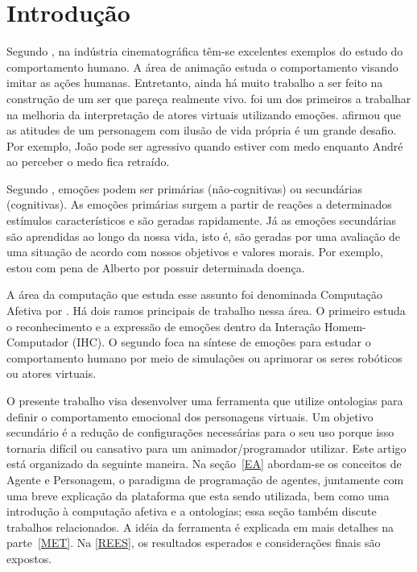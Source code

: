 \chapter{Introdução}

Segundo \citet{terzopoulos1998behavioral}, na indústria cinematográfica têm-se
excelentes exemplos do estudo do comportamento humano.  A área de animação
estuda o comportamento visando imitar as ações humanas.  Entretanto, ainda há
muito trabalho a ser feito na construção de um ser que pareça realmente vivo.
%
\citet{bates1994role} foi um dos primeiros a trabalhar na melhoria da
interpretação de atores virtuais utilizando emoções.
\citeauthor{bates1994role} afirmou que as atitudes de um personagem com ilusão
de vida própria é um grande desafio.  Por exemplo, João pode ser agressivo
quando estiver com medo enquanto André ao perceber o medo fica retraído.

Segundo \citet{damasio2004erro}, emoções podem ser primárias (não-cognitivas)
ou secundárias (cognitivas).  As emoções primárias surgem a partir de reações
a determinados estímulos característicos e são geradas rapidamente.  Já as
emoções secundárias são aprendidas ao longo da nossa vida, isto é, são geradas
por uma avaliação de uma situação de acordo com nossos objetivos e valores
morais.  Por exemplo, estou com pena de Alberto por possuir determinada
doença.

A área da computação que estuda esse assunto foi denominada Computação Afetiva
por \citet{Pic98}.  Há dois ramos principais de trabalho nessa área.  O
primeiro estuda o reconhecimento e a expressão de emoções dentro da Interação
Homem-Computador (IHC).  O segundo foca na síntese de emoções para estudar o
comportamento humano por meio de simulações ou aprimorar os seres robóticos ou
atores virtuais.


O presente trabalho visa desenvolver uma ferramenta que utilize ontologias
para definir o comportamento emocional dos personagens virtuais.  Um objetivo
secundário é a redução de configurações necessárias para o seu uso porque isso
tornaria difícil ou cansativo para um animador/programador utilizar.
%
Este artigo está organizado da seguinte maneira.  Na
seção~\ref{EA} abordam-se os conceitos de Agente e Personagem, o paradigma de
programação de agentes, juntamente com uma breve explicação da plataforma que
esta sendo utilizada, bem como uma introdução à computação afetiva e a
ontologias; essa seção também discute trabalhos relacionados.  A idéia da
ferramenta é explicada em mais detalhes na parte~\ref{MET}. Na \ref{REES}, os
resultados esperados e considerações finais são expostos.
